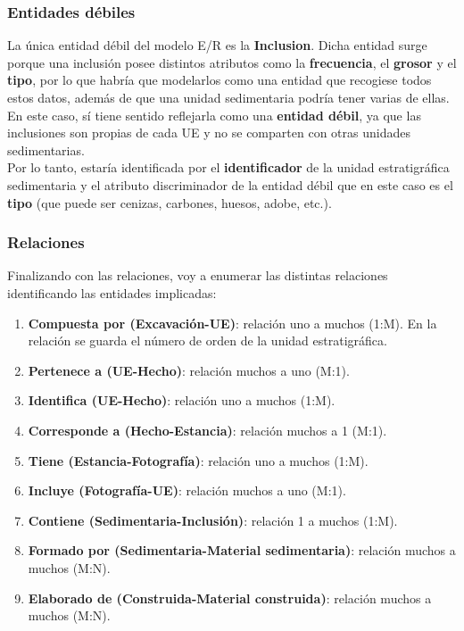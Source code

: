     \subsubsection{Entidades débiles}
    La única entidad débil del modelo E/R es la \textbf{\gls{Inclusion}}. Dicha entidad surge
    porque una inclusión posee distintos atributos como la \textbf{frecuencia}, el \textbf{grosor}
    y el \textbf{tipo}, por lo que habría que modelarlos como una entidad que recogiese todos estos
    datos, además de que una unidad sedimentaria podría tener varias de ellas. En este caso, sí
    tiene sentido reflejarla como una \textbf{entidad débil}, ya que las inclusiones son propias de
    cada UE y no se comparten con otras unidades sedimentarias.\\

    Por lo tanto, estaría identificada por el \textbf{identificador} de la unidad estratigráfica
    sedimentaria y el atributo discriminador de la entidad débil que en este caso es el
    \textbf{tipo} (que puede ser cenizas, carbones, huesos, adobe, etc.).

    \subsubsection{Relaciones}
    Finalizando con las relaciones, voy a enumerar las distintas relaciones identificando las
    entidades implicadas:

        \begin{enumerate}
            \item \textbf{Compuesta por (Excavación-UE)}: relación uno a muchos (1:M). En la
            relación se guarda el número de orden de la unidad estratigráfica.
            \item \textbf{Pertenece a (UE-Hecho)}: relación muchos a uno (M:1).
            \item \textbf{Identifica (UE-Hecho)}: relación uno a muchos (1:M).
            \item \textbf{Corresponde a (Hecho-Estancia)}: relación muchos a 1 (M:1).
            \item \textbf{Tiene (Estancia-Fotografía)}: relación uno a muchos (1:M).
            \item \textbf{Incluye (Fotografía-UE)}: relación muchos a uno (M:1).
            \item \textbf{Contiene (Sedimentaria-Inclusión)}: relación 1 a muchos (1:M).
            \item \textbf{Formado por (Sedimentaria-Material sedimentaria)}: relación muchos a
            muchos (M:N).
            \item \textbf{Elaborado de (Construida-Material construida)}: relación muchos a
            muchos (M:N).
        \end{enumerate}

